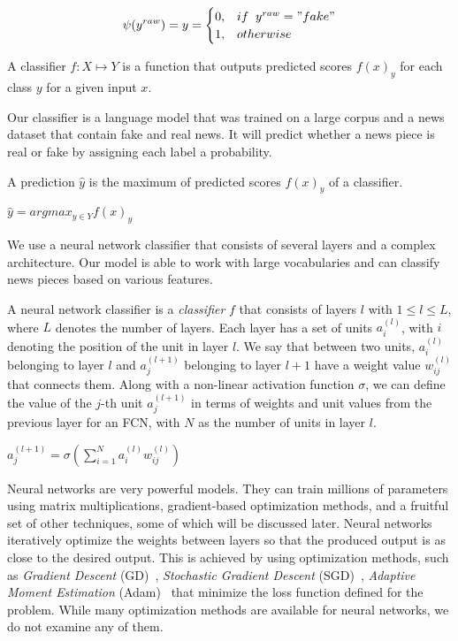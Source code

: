 \begin{center}
    \[\psi(y^{raw}) = y =
        \begin{cases}
            0, & if \;\; y^{raw} = "fake" \\
            1, & otherwise                \\
        \end{cases}
    \]
\end{center}
\begin{definition}
    A classifier $f:X \mapsto Y$ is a function that outputs predicted scores $f(x)_y$ for each class $y$ for a given input $x$.
\end{definition}
Our classifier is a language model that was trained on a large corpus and a news dataset that contain fake and real news. It will predict whether a news piece is real or fake by assigning each label a probability.
\begin{definition}
    A prediction $\hat{y}$ is the maximum of predicted scores $f(x)_y$ of a classifier.
    \begin{center}
        $\hat{y} = argmax_{y \in Y} f(x)_y$
    \end{center}
\end{definition}
We use a neural network classifier that consists of several layers and a complex architecture. Our model is able to work with large vocabularies and can classify news pieces based on various features.
\begin{definition}
    A neural network classifier is a \emph{classifier} $f$ that consists of layers $l$ with $1 \leq l \leq L$, where $L$ denotes the number of layers. Each layer has a set of units $a_i^{(l)}$, with $i$ denoting the position of the unit in layer $l$. We say that between two units, $a_i^{(l)}$ belonging to layer $l$ and $a_j^{(l+1)}$ belonging to layer
    $l+1$ have a weight value $w_{ij}^{(l)}$ that connects them. Along with a non-linear activation function $\sigma$, we
    can define the value of the $j$-th unit $a_j^{(l+1)}$ in terms of weights and unit values from the previous layer for an FCN, with $N$ as the number of units in layer $l$.
    \begin{center}
        $a_j^{(l+1)} = \sigma(\sum\limits_{i=1}^{N} a_i^{(l)} w_{ij}^{(l)})$
    \end{center}
\end{definition}
Neural networks are very powerful models. They can train millions of parameters using matrix multiplications, gradient-based optimization methods, and a fruitful set of other techniques, some of which will be discussed later. Neural networks iteratively optimize the weights between layers so that the produced output is as close to the desired output. This is achieved by using optimization methods, such as \emph{Gradient Descent} (GD)~\parencite{GD_Cauchy}, \emph{Stochastic Gradient Descent} (SGD)~\parencite{SGD_Robbins}, \emph{Adaptive Moment Estimation} (Adam)~\parencite{Adam_Kingma} that minimize the loss function defined for the problem. While many optimization methods are available for neural networks, we do not examine any of them.\\
